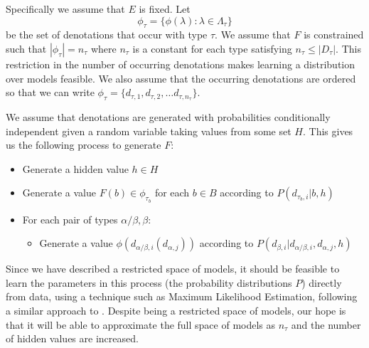 \documentclass[letterpaper]{article}
\newcommand{\citet}[1]{\newcite{#1}}
\begin{document}
Specifically we assume that $E$ is fixed. Let
$$\phi_\tau = \{\phi(\lambda) : \lambda\in \Lambda_\tau\}$$
be the set of denotations that occur with type $\tau$. We assume that
$F$ is constrained such that $|\phi_\tau| = n_\tau$ where $n_\tau$
is a constant for each type satisfying $n_\tau \le |D_\tau|$. This
restriction in the number of occurring denotations makes learning a
distribution over models feasible. We also assume that the occurring
denotations are ordered so that we can write $\phi_\tau =
\{d_{\tau,1}, d_{\tau,2}, \ldots d_{\tau, n_\tau}\}$.


We assume that denotations are generated with probabilities
conditionally independent given a random variable taking values from
some set $H$. This gives us the following process to generate $F$:
\begin{itemize}
\item Generate a hidden value $h\in H$
\item Generate a value $F(b) \in \phi_{\tau_b}$ for each $b\in B$ according to
  $P(d_{\tau_b,i}|b, h)$
\item For each pair of types $\alpha/\beta, \beta$:
\begin{itemize}
\item Generate a value $\phi(d_{\alpha/\beta,i}(d_{\alpha,j}))$
  according to $P(d_{\beta,i}|d_{\alpha/\beta,i}, d_{\alpha,j},h)$
\end{itemize}
\end{itemize}

Since we have described a restricted space of models, it should be
feasible to learn the parameters in this process (the probability
distributions $P$) directly from data, using a technique such as Maximum
Likelihood Estimation, following a similar approach to
\citet{Sato:95}. Despite being a restricted space of models, our hope
is that it will be able to approximate the full space of models as
$n_\tau$ and the number of hidden values are increased.

\end{document}
